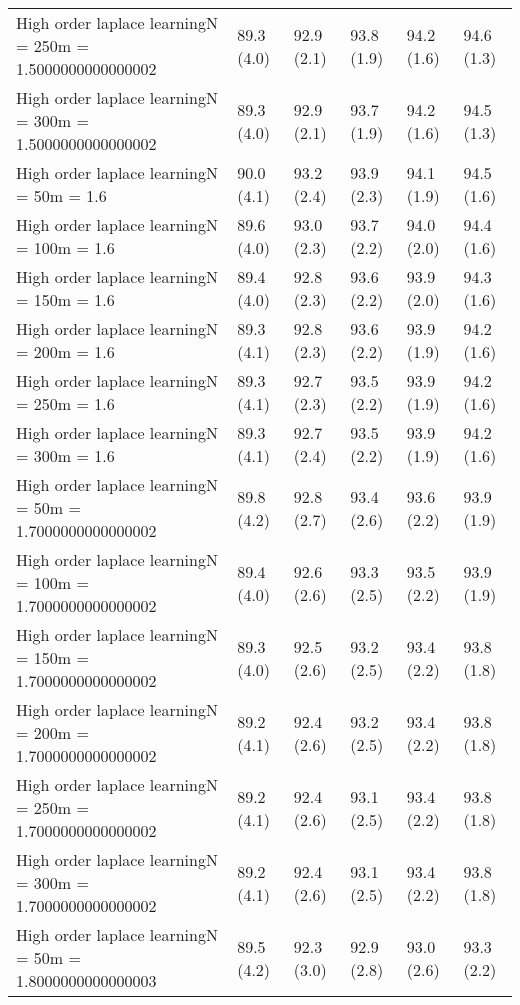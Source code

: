 \documentclass{article}
\begin{document}
\begin{table*}[t!]
\begin{center}
\begin{small}
\begin{sc}
\begin{tabular}{llllll}
High order laplace learningN = 250m = 1.5000000000000002&89.3 (4.0)      &92.9 (2.1)      &93.8 (1.9)      &94.2 (1.6)      &94.6 (1.3)      \\
High order laplace learningN = 300m = 1.5000000000000002&89.3 (4.0)      &92.9 (2.1)      &93.7 (1.9)      &94.2 (1.6)      &94.5 (1.3)      \\
High order laplace learningN = 50m = 1.6&90.0 (4.1)      &93.2 (2.4)      &93.9 (2.3)      &94.1 (1.9)      &94.5 (1.6)      \\
High order laplace learningN = 100m = 1.6&89.6 (4.0)      &93.0 (2.3)      &93.7 (2.2)      &94.0 (2.0)      &94.4 (1.6)      \\
High order laplace learningN = 150m = 1.6&89.4 (4.0)      &92.8 (2.3)      &93.6 (2.2)      &93.9 (2.0)      &94.3 (1.6)      \\
High order laplace learningN = 200m = 1.6&89.3 (4.1)      &92.8 (2.3)      &93.6 (2.2)      &93.9 (1.9)      &94.2 (1.6)      \\
High order laplace learningN = 250m = 1.6&89.3 (4.1)      &92.7 (2.3)      &93.5 (2.2)      &93.9 (1.9)      &94.2 (1.6)      \\
High order laplace learningN = 300m = 1.6&89.3 (4.1)      &92.7 (2.4)      &93.5 (2.2)      &93.9 (1.9)      &94.2 (1.6)      \\
High order laplace learningN = 50m = 1.7000000000000002&89.8 (4.2)      &92.8 (2.7)      &93.4 (2.6)      &93.6 (2.2)      &93.9 (1.9)      \\
High order laplace learningN = 100m = 1.7000000000000002&89.4 (4.0)      &92.6 (2.6)      &93.3 (2.5)      &93.5 (2.2)      &93.9 (1.9)      \\
High order laplace learningN = 150m = 1.7000000000000002&89.3 (4.0)      &92.5 (2.6)      &93.2 (2.5)      &93.4 (2.2)      &93.8 (1.8)      \\
High order laplace learningN = 200m = 1.7000000000000002&89.2 (4.1)      &92.4 (2.6)      &93.2 (2.5)      &93.4 (2.2)      &93.8 (1.8)      \\
High order laplace learningN = 250m = 1.7000000000000002&89.2 (4.1)      &92.4 (2.6)      &93.1 (2.5)      &93.4 (2.2)      &93.8 (1.8)      \\
High order laplace learningN = 300m = 1.7000000000000002&89.2 (4.1)      &92.4 (2.6)      &93.1 (2.5)      &93.4 (2.2)      &93.8 (1.8)      \\
High order laplace learningN = 50m = 1.8000000000000003&89.5 (4.2)      &92.3 (3.0)      &92.9 (2.8)      &93.0 (2.6)      &93.3 (2.2)      \\

\end{tabular}
\end{sc}
\end{small}
\end{center}
\end{table*}
\end{document}
